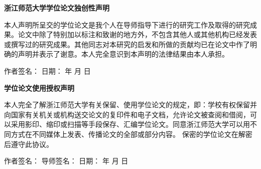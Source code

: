 \documentclass[12pt,]{report}
\begin{document}
\clearpage
\clearpage\pagestyle{empty}\mbox{}\clearpage
\vspace*{0.0cm}

\begin{center}
\Large \textbf{浙江师范大学学位论文独创性声明}
\end{center}\vspace{0.54cm}

\pagestyle{plain}

\vspace{1.5cm}


本人声明所呈交的学位论文是我个人在导师指导下进行的研究工作及取得的研究成果。论文中除了特别加以标注和致谢的地方外，不包含其他人或其他机构已经发表或撰写过的研究成果。其他同志对本研究的启发和所做的贡献均已在论文中作了明确的声明并表示了谢意。本人完全意识到本声明的法律结果由本人承担。

\indent 作者签名： \hspace*{12em}     日期： \hspace*{0.6cm}   年 \hspace*{0.6cm}   月 \hspace*{0.6cm}   日 


\vspace{1.5cm}

\begin{center}
\Large \textbf{学位论文使用授权声明}
\end{center}\vspace{0.54cm}

\pagestyle{plain}

\vspace{1.5cm}



本人完全了解浙江师范大学有关保留、使用学位论文的规定，即：学校有权保留并向国家有关机关或机构送交论文的复印件和电子文档，允许论文被查阅和借阅，可以采用影印、缩印或扫描等手段保存、汇编学位论文。同意浙江师范大学可以用不同方式在不同媒体上发表、传播论文的全部或部分内容。
保密的学位论文在解密后遵守此协议。

作者签名：\hspace*{1.8cm}   导师签名：  \hspace*{1.8cm}      日期： \hspace*{0.6cm}   年 \hspace*{0.6cm}   月   \hspace*{0.6cm} 日  
\end{document}
